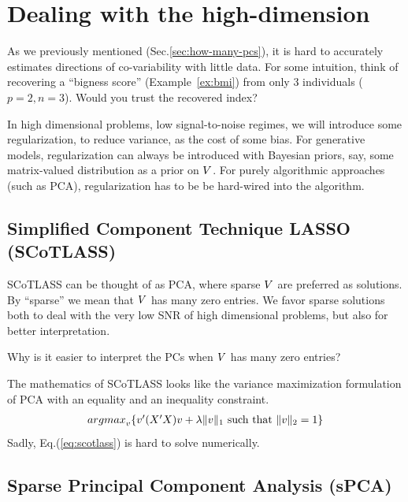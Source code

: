 \documentclass[12pt,a4paper]{article}
\begin{document}
\section{Dealing with the high-dimension}

As we previously mentioned (Sec.\ref{sec:how-many-pcs}), it is hard to accurately estimates directions of co-variability with little data. 
For some intuition, think of recovering a ``bigness score'' (Example~\ref{ex:bmi}) from only 3 individuals ($p=2,n=3$). 
Would you trust the recovered index?

In high dimensional problems, \aka low signal-to-noise regimes, we will introduce some regularization, to reduce variance, as the cost of some bias. 
For generative models, regularization can always be introduced with Bayesian priors, say, some matrix-valued distribution as a prior on $V$. 
For purely algorithmic approaches (such as PCA), regularization has to be be hard-wired into the algorithm.





\subsection{Simplified Component Technique LASSO (SCoTLASS)}

SCoTLASS can be thought of as PCA, where sparse $V$ are preferred as solutions.
By ``sparse'' we mean that $V$ has many zero entries. 
We favor sparse solutions both to deal with the very low SNR of high dimensional problems, but also for better interpretation.

\begin{think}
	Why is it easier to interpret the PCs when $V$ has many zero entries?
\end{think}

The mathematics of SCoTLASS looks like the variance maximization formulation of PCA with an equality and an inequality constraint.
\begin{align}
\label{eq:scotlass}
	\textstyle{\mathop{argmax}_{v}}\{ v'(X'X)v  + \lambda \Vert v \Vert_1 \text{ such that } \Vert v \Vert_2=1  \}
\end{align}
Sadly, Eq.(\ref{eq:scotlass}) is hard to solve numerically.


\subsection{Sparse Principal Component Analysis (sPCA)}
\label{sec:sPCA}
\end{document}

